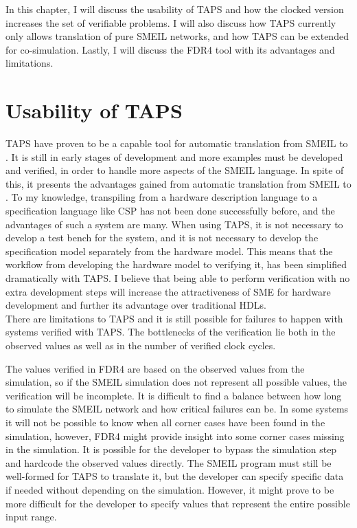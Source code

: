 In this chapter, I will discuss the usability of TAPS and how the clocked version increases the set of verifiable problems. I will also discuss how TAPS currently only allows translation of pure SMEIL networks, and how TAPS can be extended for co-simulation. Lastly, I will discuss the FDR4 tool with its advantages and limitations.
\section{Usability of TAPS}
TAPS have proven to be a capable tool for automatic translation from SMEIL to \cspm{}. It is still in early stages of development and more examples must be developed and verified, in order to handle more aspects of the SMEIL language. In spite of this, it presents the advantages gained from automatic translation from SMEIL to \cspm{}. To my knowledge, transpiling from a hardware description language to a specification language like CSP has not been done successfully before, and the advantages of such a system are many. When using TAPS, it is not necessary to develop a test bench for the system, and it is not necessary to develop the specification model separately from the hardware model. This means that the workflow from developing the hardware model to verifying it, has been simplified dramatically with TAPS. I believe that being able to perform verification with no extra development steps will increase the attractiveness of SME for hardware development and further its advantage over traditional HDLs.\\

There are limitations to TAPS and it is still possible for failures to happen with systems verified with TAPS. The bottlenecks of the verification lie both in the observed values as well as in the number of verified clock cycles.

The values verified in FDR4 are based on the observed values from the simulation, so if the SMEIL simulation does not represent all possible values, the verification will be incomplete.
It is difficult to find a balance between how long to simulate the SMEIL network and how critical failures can be. In some systems it will not be possible to know when all corner cases have been found in the simulation, however, FDR4 might provide insight into some corner cases missing in the simulation.
It is possible for the developer to bypass the simulation step and hardcode the observed values directly. The SMEIL program must still be well-formed for TAPS to translate it, but the developer can specify specific data if needed without depending on the simulation. However, it might prove to be more difficult for the developer to specify values that represent the entire possible input range.\\


